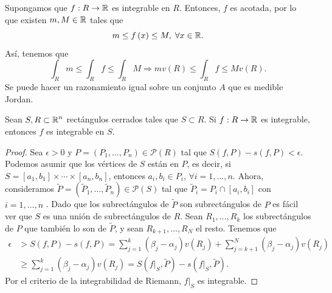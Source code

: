 \begin{observation}
Supongamos que $\displaystyle f:R \to \mathbb{R} $ es integrable en $\displaystyle R $. Entonces, $\displaystyle f $ es acotada, por lo que existen $\displaystyle m,M \in \mathbb{R} $ tales que 
\[m \leq f\left(x\right)\leq M, \; \forall x \in \mathbb{R} .\]
Así, tenemos que 
\[\int _{R}m \leq \int _{R}f \leq \int _{R}M \Rightarrow mv\left(R\right) \leq \int _{R}f \leq Mv\left(R\right) .\]
Se puede hacer un razonamiento igual sobre un conjunto $\displaystyle A $ que es medible Jordan.
\end{observation}
 
\begin{prop}
Sean $\displaystyle S,R \subset \mathbb{R}^{n} $ rectángulos cerrados tales que $\displaystyle S \subset R $. Si $\displaystyle f : R \to \mathbb{R} $ es integrable, entonces $\displaystyle f $ es integrable en $\displaystyle S $.
\end{prop}
\begin{proof}
	Sea $\displaystyle \epsilon > 0 $ y $\displaystyle P = \left(P_{1}, \ldots, P_{n}\right) \in \mathcal{P}\left(R\right) $ tal que $\displaystyle S\left(f,P\right)-s\left(f,P\right) < \epsilon  $. Podemos asumir que los vértices de $\displaystyle S $ están en $\displaystyle P $, es decir, si $\displaystyle S = \left[a_{1}, b_{1}\right] \times \cdots \times \left[a_{n}, b_{n}\right]  $, entonces $\displaystyle a_{i}, b_{i} \in P_{i} $, $\displaystyle \forall i = 1, \ldots, n $. 
	Ahora, consideramos $\displaystyle \tilde{P} = \left(\tilde{P}_{1}, \ldots, \tilde{P}_{n}\right) \in \mathcal{P}\left(S\right) $ tal que $\displaystyle \tilde{P}_{i} = P_{i} \cap \left[a_{i}, b_{i}\right]  $ con $\displaystyle i = 1, \ldots, n $ . 
	Dado que los subrectángulos de $\displaystyle \tilde{P} $ son subrectángulos de $\displaystyle P $ es fácil ver que $\displaystyle S $ es una unión de subrectángulos de $\displaystyle R $. Sean $\displaystyle R_{1}, \ldots, R_{k} $ los subrectángulos de $\displaystyle P $ que también lo son de $\displaystyle \tilde{P}  $, y sean $\displaystyle R_{k + 1}, \ldots, R_{N} $ el resto. 
	Tenemos que 
\[
\begin{split}
	\epsilon & > S\left(f,P\right)-s\left(f,P\right) = \sum^{k}_{j = 1}\left(\beta_{j}-\alpha_{j}\right)v\left(R_{j}\right) + \sum^{N}_{j = k + 1}\left(\beta_{j}-\alpha_{j}\right)v\left(R_{j}\right) \\
		 & \geq \sum^{k}_{j = 1}\left(\beta_{j}-\alpha_{j}\right)v\left(R_{j}\right) = S\left(f|_{S}, \tilde{P}\right) - s\left(f|_{S}, \tilde{P}\right).
\end{split}
\]
Por el criterio de la integrabilidad de Riemann, $\displaystyle f|_{S} $ es integrable.	
\end{proof}
